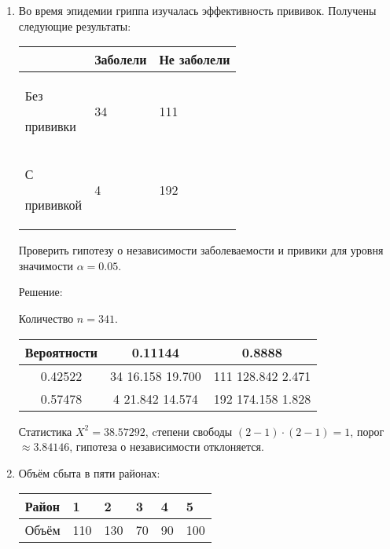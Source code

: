 \documentclass[a4paper,12pt]{article}
\begin{document}
\begin{enumerate}
      \item \cite[306]{Efimov} Во время эпидемии гриппа изучалась эффективность прививок. Получены следующие результаты:

            \begin{center}
                  \begin{tabular}{|P{3cm}|P{3cm}|P{3cm}|}
                        \hline
                                          & Заболели & Не заболели \\
                        \hline
                        Без \par прививки & 34       & 111         \\
                        \hline
                        С \par прививкой  & 4        & 192         \\
                        \hline
                  \end{tabular}
            \end{center}

            Проверить гипотезу о независимости заболеваемости и привики для уровня значимости $\alpha = 0.05$.

            Решение: \par
            Количество $n=341$.

            \begin{tabular}{|c|c|c|}
                  \hline
                  Вероятности & 0.11144          & 0.8888            \\
                  \hline
                  0.42522     & 34 16.158 19.700 & 111 128.842 2.471 \\
                  \hline
                  0.57478     & 4 21.842 14.574  & 192 174.158 1.828 \\
                  \hline
            \end{tabular}

            Статистика $X^2 = 38.57292$, cтепени свободы $(2-1) \cdot (2-1) = 1$, порог $\approx 3.84146$, гипотеза о независимости отклоняется.

      \item \cite[285]{Efimov} Объём сбыта в пяти районах:

            \begin{center}
                  \begin{tabular}{|P{1.5cm}|P{1cm}|P{1cm}|P{1cm}|P{1cm}|P{1cm}|}
                        \hline
                        Район & 1   & 2   & 3  & 4  & 5   \\
                        \hline
                        Объём & 110 & 130 & 70 & 90 & 100 \\
                        \hline
                  \end{tabular}
            \end{center}


\end{enumerate}
\end{document}
